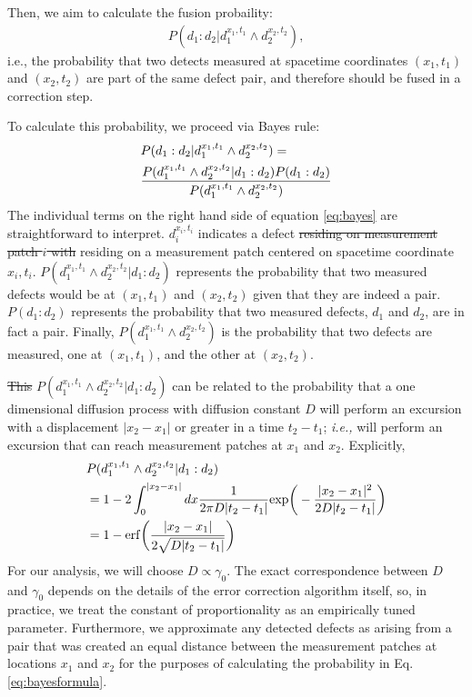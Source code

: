 \documentclass[twocolumn,superscriptaddress,aps,prb,floatfix]{revtex4-1}
\newcommand{\CMH}[1]{{\color{green} { #1}}}
\newcommand{\MS}[1]{{\color{mauve} {#1}}}
\begin{document}
Then, we aim to calculate the fusion probaility:
\begin{align}
P(d_1:d_2 | d_1^{x_1,t_1} \wedge d_2^{x_2,t_2}),
\end{align}
i.e., the probability that two detects measured at spacetime coordinates $(x_1,t_1)$ and $(x_2,t_2)$ are part of the same defect pair, and therefore should be fused in a correction step.

To calculate this probability, we proceed via Bayes rule: 
\begin{align}
\label{eq:bayes}
&P(d_1:d_2 | d_1^{x_1,t_1} \wedge d_2^{x_2,t_2}) = \\ \notag
&\frac{P(d_1^{x_1,t_1} \wedge d_2^{x_2,t_2} | d_1:d_2) P(d_1 : d_2)}{P(d_1^{x_1,t_1}\wedge d_2^{x_2,t_2})}
\end{align}
The individual terms on the right hand side of equation \ref{eq:bayes} are straightforward to interpret.  $d_i^{x_i,t_i}$ indicates a defect \MS{\sout{residing on measurement patch $i$ with} residing on a measurement patch centered on} spacetime coordinate $x_i,t_i$.  $P(d_1^{x_1,t_1} \wedge d_2^{x_2,t_2} | d_1:d_2)$ represents the probability that two measured defects would be at $(x_1,t_1)$ and $(x_2,t_2)$ given that they are indeed a pair. \CMH{$P(d_1 : d_2)$ represents the probability that two measured defects, $d_1$ and $d_2$, are in fact a pair.  Finally, $P(d_1^{x_1,t_1}\wedge d_2^{x_2,t_2})$ is the probability that two defects are measured, one at $(x_1,t_1)$, and the other at $(x_2,t_2)$. }


\CMH{\sout{This} $P(d_1^{x_1,t_1} \wedge d_2^{x_2,t_2} | d_1:d_2)$} can be related to the probability that a one dimensional diffusion process with diffusion constant $D$ will perform an excursion with a displacement $|x_2-x_1|$ or greater in a time $t_2 - t_1$; \textit{i.e.,} will perform an excursion that can reach measurement patches at $x_1$ and $x_2$. Explicitly,
\begin{align}
\label{eq:bayesformula}
&P(d_1^{x_1,t_1} \wedge d_2^{x_2,t_2} | d_1:d_2) \\ \notag
&= 1-2\int_{0}^{|x_2-x_1|} dx \frac{1}{2\pi D |t_2-t_1|} {\rm exp}\bigg(-\frac{|x_2-x_1|^2}{2 D |t_2-t_1|}\bigg) \\ \notag 
&= 1 - {\rm erf}\bigg(\frac{|x_2-x_1|}{2\sqrt{D |t_2 - t_1|}}\bigg) 
\end{align}
For our analysis, we will choose $D\propto \gamma_0$.  The exact correspondence between $D$ and $\gamma_0$ depends on the details of the error correction algorithm itself, so, in practice, we treat the constant of proportionality as an empirically tuned parameter.  Furthermore, we approximate any detected defects as arising from a pair that was created an equal distance between the measurement patches at locations $x_1$ and $x_2$ for the purposes of calculating the probability in Eq. \ref{eq:bayesformula}.
\end{document}
